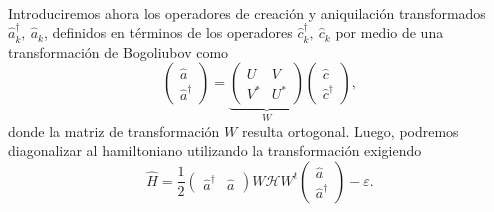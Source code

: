 \documentclass{scrartcl}
\newcommand{\inv}[1]{\frac{1}{#1}}
\renewcommand{\a}{\hat{a}}
\renewcommand{\c}{\hat{c}}
\DeclareRobustCommand{\[}{\begin{equation}}
\DeclareRobustCommand{\]}{\end{equation}}
\begin{document}
\begin{enumerate}
\begin{enumerate}
\begin{enumerate}[(i)]
\begin{align}
            \end{align}
            
            Introduciremos ahora los operadores de creación y aniquilación transformados $\a_k^\dagger, \ \a_k$, definidos en términos de los operadores $\c_k^\dagger, \ \c_k$ por medio de una transformación de Bogoliubov como
            \[ \begin{pmatrix} \a \\ \a^\dagger \end{pmatrix} = \underbrace{\begin{pmatrix} U & V \\ V^* & U^* \end{pmatrix}}_{W} \begin{pmatrix} \c \\ \c^\dagger \end{pmatrix}, \]
            donde la matriz de transformación $W$ resulta ortogonal. Luego, podremos diagonalizar al hamiltoniano utilizando la transformación exigiendo
            \[ \hat H = \inv{2} \begin{pmatrix} \a^\dagger & \a \end{pmatrix} W \mathcal{H} W^t \begin{pmatrix} \a \\ \a^\dagger \end{pmatrix} - \varepsilon. \]
            

\end{enumerate}
\end{enumerate}
\end{enumerate}
\end{document}
